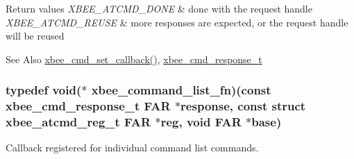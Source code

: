 \begin{DoxyRetVals}{Return values}
{\em X\-B\-E\-E\-\_\-\-A\-T\-C\-M\-D\-\_\-\-D\-O\-N\-E} & done with the request handle \\
\hline
{\em X\-B\-E\-E\-\_\-\-A\-T\-C\-M\-D\-\_\-\-R\-E\-U\-S\-E} & more responses are expected, or the request handle will be reused\\
\hline
\end{DoxyRetVals}
\begin{DoxySeeAlso}{See Also}
\hyperlink{group__xbee__atcmd_ga0a5d2e2e87743061c46abd53e379e014}{xbee\-\_\-cmd\-\_\-set\-\_\-callback()}, \hyperlink{structxbee__cmd__response__t}{xbee\-\_\-cmd\-\_\-response\-\_\-t} 
\end{DoxySeeAlso}
\hypertarget{group__xbee__atcmd_ga0d223ca5aacf39a0469f444fae5d1503}{
\subsubsection[{xbee\-\_\-command\-\_\-list\-\_\-fn}]{\setlength{\rightskip}{0pt plus 5cm}typedef void($\ast$ xbee\-\_\-command\-\_\-list\-\_\-fn)(const {\bf xbee\-\_\-cmd\-\_\-response\-\_\-t} {\bf F\-A\-R} $\ast$response, const struct {\bf xbee\-\_\-atcmd\-\_\-reg\-\_\-t} {\bf F\-A\-R} $\ast$reg, void {\bf F\-A\-R} $\ast$base)}}\label{group__xbee__atcmd_ga0d223ca5aacf39a0469f444fae5d1503}


Callback registered for individual command list commands. 


